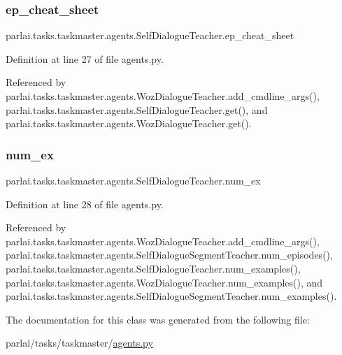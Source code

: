 \subsubsection{\texorpdfstring{ep\+\_\+cheat\+\_\+sheet}{ep\_cheat\_sheet}}
{\footnotesize\ttfamily parlai.\+tasks.\+taskmaster.\+agents.\+Self\+Dialogue\+Teacher.\+ep\+\_\+cheat\+\_\+sheet}



Definition at line 27 of file agents.\+py.



Referenced by parlai.\+tasks.\+taskmaster.\+agents.\+Woz\+Dialogue\+Teacher.\+add\+\_\+cmdline\+\_\+args(), parlai.\+tasks.\+taskmaster.\+agents.\+Self\+Dialogue\+Teacher.\+get(), and parlai.\+tasks.\+taskmaster.\+agents.\+Woz\+Dialogue\+Teacher.\+get().

\mbox{\label{classparlai_1_1tasks_1_1taskmaster_1_1agents_1_1SelfDialogueTeacher_a8a3fced952427353aba96b59a8efe0d2}} 
\subsubsection{\texorpdfstring{num\+\_\+ex}{num\_ex}}
{\footnotesize\ttfamily parlai.\+tasks.\+taskmaster.\+agents.\+Self\+Dialogue\+Teacher.\+num\+\_\+ex}



Definition at line 28 of file agents.\+py.



Referenced by parlai.\+tasks.\+taskmaster.\+agents.\+Woz\+Dialogue\+Teacher.\+add\+\_\+cmdline\+\_\+args(), parlai.\+tasks.\+taskmaster.\+agents.\+Self\+Dialogue\+Segment\+Teacher.\+num\+\_\+episodes(), parlai.\+tasks.\+taskmaster.\+agents.\+Self\+Dialogue\+Teacher.\+num\+\_\+examples(), parlai.\+tasks.\+taskmaster.\+agents.\+Woz\+Dialogue\+Teacher.\+num\+\_\+examples(), and parlai.\+tasks.\+taskmaster.\+agents.\+Self\+Dialogue\+Segment\+Teacher.\+num\+\_\+examples().



The documentation for this class was generated from the following file\+:\begin{DoxyCompactItemize}
\item 
parlai/tasks/taskmaster/\hyperlink{parlai_2tasks_2taskmaster_2agents_8py}{agents.\+py}\end{DoxyCompactItemize}
